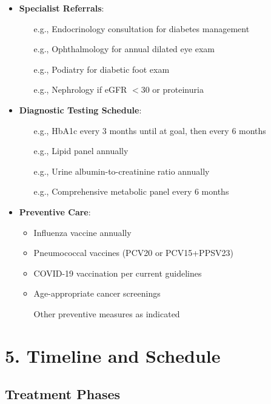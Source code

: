 \documentclass[11pt,letterpaper]{article}
\begin{document}
\begin{itemize}[leftmargin=*]
    \item \textbf{Specialist Referrals}:
    \begin{itemize}
        \item [e.g., Endocrinology consultation for diabetes management]
        \item [e.g., Ophthalmology for annual dilated eye exam]
        \item [e.g., Podiatry for diabetic foot exam]
        \item [e.g., Nephrology if eGFR $<$30 or proteinuria]
    \end{itemize}
    
    \item \textbf{Diagnostic Testing Schedule}:
    \begin{itemize}
        \item [e.g., HbA1c every 3 months until at goal, then every 6 months]
        \item [e.g., Lipid panel annually]
        \item [e.g., Urine albumin-to-creatinine ratio annually]
        \item [e.g., Comprehensive metabolic panel every 6 months]
    \end{itemize}
    
    \item \textbf{Preventive Care}:
    \begin{itemize}
        \item Influenza vaccine annually
        \item Pneumococcal vaccines (PCV20 or PCV15+PPSV23)
        \item COVID-19 vaccination per current guidelines
        \item Age-appropriate cancer screenings
        \item [Other preventive measures as indicated]
    \end{itemize}
\end{itemize}

\section*{5. Timeline and Schedule}

\subsection*{Treatment Phases}
\end{document}
